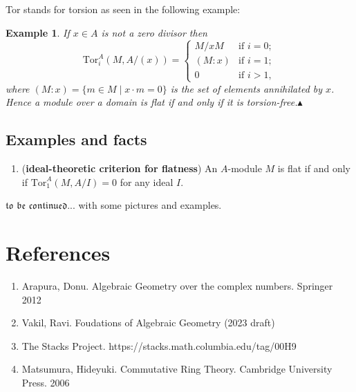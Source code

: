 \documentclass[12pt]{article}
\theoremstyle{mytheoremstyle}
\newtheorem{example}{Example}
\newcommand{\tor}{\text{Tor}}
\begin{document}
Tor stands for torsion as seen in the following example:
\begin{example}
    If $x\in A$ is not a zero divisor then
    $$\tor^A_i(M,A/(x))=\begin{cases}
        M/xM & \text{if } i=0;\\
        (M:x) & \text{if } i=1;\\
        0 & \text{if } i>1,
    \end{cases}$$
    where $(M:x)=\{m\in M\mid x\cdot m=0\}$ is the set of elements
    annihilated by $x$. Hence a module over a domain is flat if and
    only if it is torsion-free.$\blacktriangle$
\end{example}

\subsection{Examples and facts}
\begin{enumerate}
    \item (\textbf{ideal-theoretic criterion for flatness}) An
    $A$-module $M$ is flat if and only if $\tor^A_1(M,A/I)=0$
    for any ideal $I$.
\end{enumerate}

$\mathfrak{to}$ $\mathfrak{be}$ $\mathfrak{continued}...$ with
some pictures and examples.

\newpage
\section*{References}
\begin{enumerate}
    \item Arapura, Donu. Algebraic Geometry over the complex numbers. Springer 2012
    \item Vakil, Ravi. Foudations of Algebraic Geometry (2023 draft)
    \item The Stacks Project. https://stacks.math.columbia.edu/tag/00H9
    \item Matsumura, Hideyuki. Commutative Ring Theory. Cambridge University Press. 2006
\end{enumerate}

\setcounter{section}{1}
\setcounter{theorem}{1}
\end{document}
